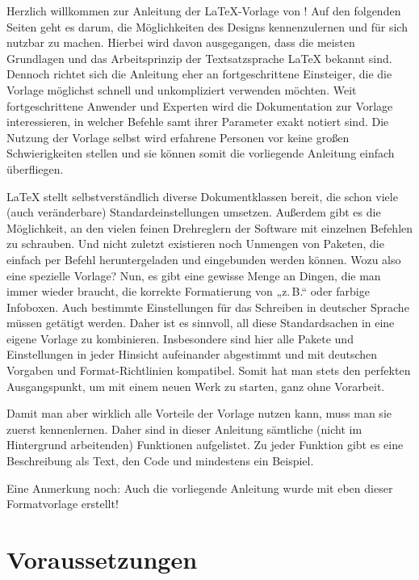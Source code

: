			Herzlich willkommen zur Anleitung der \LaTeX{}-Vorlage von ! Auf den folgenden Seiten geht es darum, die Möglichkeiten des Designs kennenzulernen und für sich nutzbar zu machen. Hierbei wird davon ausgegangen, dass die meisten Grundlagen und das Arbeitsprinzip der Textsatzsprache \LaTeX{} bekannt sind. Dennoch richtet sich die Anleitung eher an fortgeschrittene Einsteiger, die die Vorlage möglichst schnell und unkompliziert verwenden möchten. Weit fortgeschrittene Anwender und Experten wird die Dokumentation zur Vorlage interessieren, in welcher Befehle samt ihrer Parameter exakt notiert sind. Die Nutzung der Vorlage selbst wird erfahrene Personen vor keine großen Schwierigkeiten stellen und sie können somit die vorliegende Anleitung einfach überfliegen. 
			
			\LaTeX{} stellt selbstverständlich diverse Dokumentklassen bereit, die schon viele (auch veränderbare) Standardeinstellungen umsetzen. Außerdem gibt es die Möglichkeit, an den vielen feinen Drehreglern der Software mit einzelnen Befehlen zu schrauben. Und nicht zuletzt existieren noch Unmengen von Paketen, die einfach per Befehl heruntergeladen und eingebunden werden können. Wozu also eine spezielle Vorlage? Nun, es gibt eine gewisse Menge an Dingen, die man immer wieder braucht, \zb die korrekte Formatierung von „z.\,B.“ oder farbige Infoboxen. Auch bestimmte Einstellungen für das Schreiben in deutscher Sprache müssen getätigt werden. Daher ist es sinnvoll, all diese Standardsachen in eine eigene Vorlage zu kombinieren. Insbesondere sind hier alle Pakete und Einstellungen in jeder Hinsicht aufeinander abgestimmt und mit deutschen Vorgaben und Format-Richtlinien kompatibel. Somit hat man stets den perfekten Ausgangspunkt, um mit einem neuen Werk zu starten, ganz ohne Vorarbeit. 
			
			Damit man aber wirklich alle Vorteile der Vorlage nutzen kann, muss man sie zuerst kennenlernen. Daher sind in dieser Anleitung sämtliche (nicht im Hintergrund arbeitenden) Funktionen aufgelistet. Zu jeder Funktion gibt es eine Beschreibung als Text, den Code und mindestens ein Beispiel. 
			
			Eine Anmerkung noch: Auch die vorliegende Anleitung wurde mit eben dieser Formatvorlage erstellt! 
	
		\section{Voraussetzungen}
		
